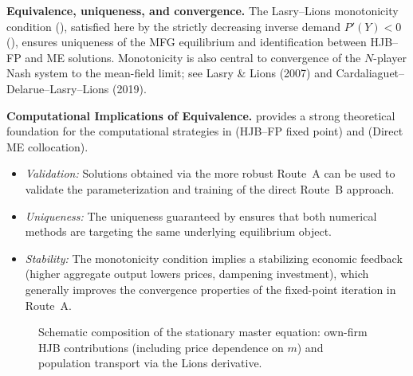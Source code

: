 ﻿\documentclass[11pt,letterpaper,oneside]{article}
\numberwithin{equation}{section}
\newcommand{\1}{\mathbf{1}}
\newcommand{\Dm}{D\_m}
\begin{document}
\begin{tcolorbox}[didacticstyle]
\begin{itemize}[leftmargin=1.1em,itemsep=0.25em]
\begin{tcolorbox}[literaturestyle]
\textbf{Equivalence, uniqueness, and convergence.} The Lasry--Lions monotonicity condition (), satisfied here by the strictly decreasing inverse demand $P'(Y)<0$ (), ensures uniqueness of the MFG equilibrium and identification between HJB--FP and ME solutions. Monotonicity is also central to convergence of the $N$-player Nash system to the mean-field limit; see Lasry \& Lions (2007) and Cardaliaguet--Delarue--Lasry--Lions (2019).
\end{tcolorbox}

\begin{tcolorbox}[mathstyle]
\textbf{Computational Implications of Equivalence.}
 provides a strong theoretical foundation for the computational strategies in  (HJB--FP fixed point) and  (Direct ME collocation).
\begin{itemize}[leftmargin=1.15em,itemsep=0.25em]
\item \emph{Validation:} Solutions obtained via the more robust Route~A can be used to validate the parameterization and training of the direct Route~B approach.
\item \emph{Uniqueness:} The uniqueness guaranteed by  ensures that both numerical methods are targeting the same underlying equilibrium object.
\item \emph{Stability:} The monotonicity condition implies a stabilizing economic feedback (higher aggregate output lowers prices, dampening investment), which generally improves the convergence properties of the fixed-point iteration in Route~A.
\end{itemize}
\end{tcolorbox}

\begin{figure}[ht]
\centering
{}
\label{fig:me_schematic}
\caption{Schematic composition of the stationary master equation: own-firm HJB contributions (including price dependence on $m$) and population transport via the Lions derivative.}
\end{figure}


\end{itemize}
\end{tcolorbox}
\end{document}
